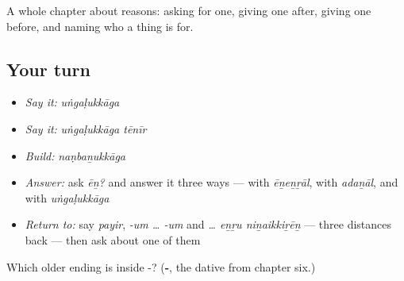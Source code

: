\begin{grammarlens}[title={What you've built}]
A whole chapter about reasons: asking for one, giving one after, giving one before, and naming who a thing is for.
\end{grammarlens}

\subsection*{Your turn}
\begin{itemize}
\raggedright
  \item \emph{Say it:} \emph{uṅgaḷukkāga}
  \item \emph{Say it:} \emph{uṅgaḷukkāga tēnīr}
  \item \emph{Build:} \emph{naṇbaṉukkāga}
  \item \emph{Answer:} ask \emph{ēṉ?} and answer it three ways — with \emph{ēṉeṉṟāl}, with \emph{adaṉāl}, and with \emph{uṅgaḷukkāga}
  \item \emph{Return to:} say \emph{payir}, \emph{-um … -um} and \emph{… eṉṟu niṉaikkiṟēṉ} — three distances back — then ask  about one of them
\end{itemize}

\begin{tcolorbox}[breakable,colback=teal!4,colframe=teal!35!black,title={Before you move on}]
Which older ending is inside -? (\textbf{-}, the dative from chapter six.)
\end{tcolorbox}
